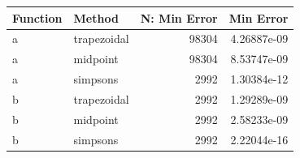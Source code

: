 \documentclass[a4paper]{article}
\begin{document}
\bgroup
\def\arraystretch{1.5}
\begin{center}
	\centering
	\begin{tabular}{l|l|r|r}
	\textbf{Function} & \textbf{Method} & \textbf{N: Min Error} & \textbf{Min Error} \\
	\hline  
	a & trapezoidal & 98304 & 4.26887e-09 \\
    a & midpoint    & 98304 & 8.53747e-09 \\
    a & simpsons    & 2992  & 1.30384e-12 \\
    b & trapezoidal & 2992  & 1.29289e-09 \\
    b & midpoint    & 2992  & 2.58233e-09 \\
    b & simpsons    & 2992  & 2.22044e-16 \\
	\end{tabular}
	\label{table:results2}
\end{center}
\egroup
 
 
 
\end{document}
